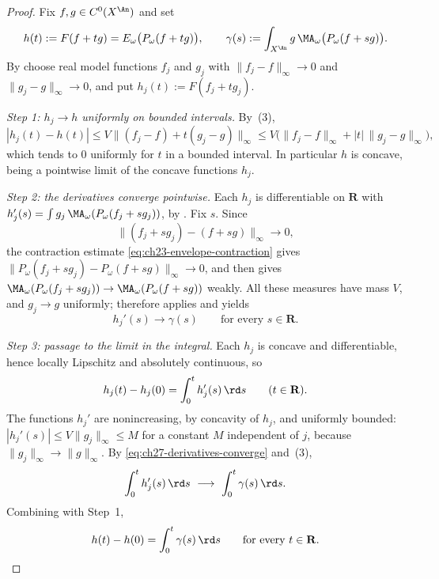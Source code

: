 \begin{proof}
Fix $f,g\in C^0(X^{\An})$ and set
\[
 h(t):=F(f+tg)=E_\omega\bigl(P_\omega(f+tg)\bigr),
 \qquad
 \gamma(s):=\int_{X^{\An}}g\,\MA_\omega\bigl(P_\omega(f+sg)\bigr).
\]
By  choose real model functions $f_j$ and
$g_j$ with
$\lVert f_j-f\rVert_\infty\to0$ and $\lVert g_j-g\rVert_\infty\to0$, and
put $h_j(t):=F(f_j+tg_j)$.

\emph{Step 1: $h_j\to h$ uniformly on bounded intervals.}
By \,(3),
\[
 |h_j(t)-h(t)|
 \leq V\lVert (f_j-f)+t(g_j-g)\rVert_\infty
 \leq V\bigl(\lVert f_j-f\rVert_\infty
       +|t|\,\lVert g_j-g\rVert_\infty\bigr),
\]
which tends to $0$ uniformly for $t$ in a bounded interval.  In
particular $h$ is concave, being a pointwise limit of the concave
functions $h_j$.

\emph{Step 2: the derivatives converge pointwise.}
Each $h_j$ is differentiable on $\mathbf R$ with
$h_j'(s)=\int g_j\,\MA_\omega(P_\omega(f_j+sg_j))$, by
.  Fix $s$.  Since
\[
 \lVert (f_j+sg_j)-(f+sg)\rVert_\infty\longrightarrow0,
\]
the contraction estimate \eqref{eq:ch23-envelope-contraction} gives
$\lVert P_\omega(f_j+sg_j)-P_\omega(f+sg)\rVert_\infty\to0$, and then
 gives
$\MA_\omega(P_\omega(f_j+sg_j))\to\MA_\omega(P_\omega(f+sg))$ weakly.  All
these measures have mass $V$, and $g_j\to g$ uniformly; therefore
 applies and yields
\begin{equation}\label{eq:ch27-derivatives-converge}
 h_j'(s)\longrightarrow\gamma(s)
 \qquad\text{for every }s\in\mathbf R .
\end{equation}

\emph{Step 3: passage to the limit in the integral.}
Each $h_j$ is concave and differentiable, hence locally Lipschitz and
absolutely continuous, so
\[
 h_j(t)-h_j(0)=\int_0^th_j'(s)\,\rd s
 \qquad(t\in\mathbf R).
\]
The functions $h_j'$ are nonincreasing, by concavity of $h_j$, and
uniformly bounded:
$|h_j'(s)|\leq V\lVert g_j\rVert_\infty\leq M$ for a constant $M$
independent of $j$, because $\lVert g_j\rVert_\infty\to\lVert
g\rVert_\infty$.  By \eqref{eq:ch27-derivatives-converge} and
\,(3),
\[
 \int_0^th_j'(s)\,\rd s\ \longrightarrow\ \int_0^t\gamma(s)\,\rd s .
\]
Combining with Step~1,
\begin{equation}\label{eq:ch27-integrated-derivative}
 h(t)-h(0)=\int_0^t\gamma(s)\,\rd s
 \qquad\text{for every }t\in\mathbf R .
\end{equation}


\end{proof}
